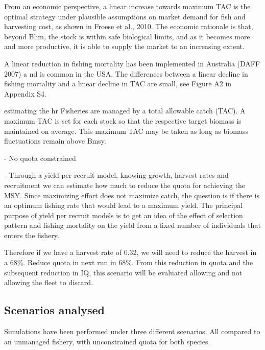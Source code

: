 \documentclass[12pt,oneline,a4paper,numbib]{ouparticle}
\begin{document}
        
From an economic perspective, a linear increase towards maximum TAC is the optimal strategy under plausible assumptions on market demand for fish and harvesting cost, as shown in Froese et al., 2010. The economic rationale is that, beyond Blim, the stock is within safe biological limits, and as it becomes more and more productive, it is able to supply the market to an increasing extent. 

A linear reduction in fishing mortality has been implemented in Australia (DAFF 2007) a nd is common in the USA. The differences between a linear decline in fishing mortality and a linear decline in TAC are small, see Figure A2 in Appendix S4.     

estimating the hr Fisheries are managed by a total allowable catch (TAC). A maximum TAC is set for each stock so that the respective target biomass is maintained
on average. This maximum TAC may be taken as long as biomass fluctuations remain above Bmsy. 

- No quota constrained

- Through a yield per recruit model, knowing growth, harvest rates and recruitment we can estimate how much to reduce the quota for achieving the MSY.  Since maximizing effort does not maximize catch, the question is if there is an optimum fishing rate that would lead to a maximum yield. The principal purpose of yield per recruit models is to get an idea of the effect of selection pattern and fishing mortality on the yield from a fixed number of individuals that enters the fishery.

Therefore if we have a harvest rate of 0.32, we will need to reduce the harvest in a 68\%. Reduce quota in next run in 68\%. From this reduction in quota and the subsequent reduction in IQ, this scenario will be evaluated allowing and not allowing the fleet to discard. 

\subsection{Scenarios analysed}
\label{sec2.4}

Simulations have been performed under three different scenarios. All compared to an unmanaged fishery, with unconstrained quota for both species.
\end{document}
